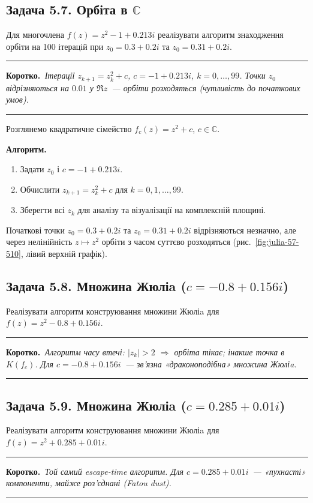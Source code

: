 \documentclass[12pt,a4paper]{article}
\newenvironment{korotko}
  {\par\medskip\noindent\begingroup\color{accent!75!black}\rule{\linewidth}{0.4pt}\par
   \noindent\textbf{Коротко.}\itshape\,}
  {\par\noindent\rule{\linewidth}{0.4pt}\endgroup\medskip}
\begin{document}
\subsection{Задача 5.7. Орбіта в $\mathbb{C}$}
Для многочлена $f(z)=z^2-1+0.213i$ реалізувати алгоритм знаходження орбіти
на 100 ітерацій при $z_0=0.3+0.2i$ та $z_0=0.31+0.2i$.

\begin{korotko}
Ітерації $z_{k+1}=z_k^2+c$, $c=-1+0.213i$, $k=0,\ldots,99$. Точки $z_0$ відрізняються
на $0.01$ у $\Re z$~--- орбіти розходяться (чутливість до початкових умов).
\end{korotko}

Розглянемо квадратичне сімейство $f_c(z)=z^2+c$, $c\in\mathbb{C}$.

\textbf{Алгоритм.}
\begin{enumerate}[leftmargin=1.6em,itemsep=0.25em]
  \item Задати $z_0$ і $c=-1+0.213i$.
  \item Обчислити $z_{k+1}=z_k^2+c$ для $k=0,1,\ldots,99$.
  \item Зберегти всі $z_k$ для аналізу та візуалізації на комплексній площині.
\end{enumerate}

Початкові точки $z_0=0.3+0.2i$ та $z_0=0.31+0.2i$ відрізняються незначно,
але через нелінійність $z\mapsto z^2$ орбіти з часом суттєво розходяться
(рис.~\ref{fig:julia-57-510}, лівий верхній графік).

\subsection{Задача 5.8. Множина Жюліa ($c=-0.8+0.156i$)}
Реалізувати алгоритм конструювання множини Жюліa для
$f(z)=z^2-0.8+0.156i$.

\begin{korotko}
Алгоритм часу втечі: $|z_k|>2$ $\Rightarrow$ орбіта тікає; інакше точка в
$K(f_c)$. Для $c=-0.8+0.156i$~--- зв'язна «драконоподібна» множина Жюліa.
\end{korotko}

\subsection{Задача 5.9. Множина Жюліa ($c=0.285+0.01i$)}
Реалізувати алгоритм конструювання множини Жюліa для
$f(z)=z^2+0.285+0.01i$.

\begin{korotko}
Той самий escape-time алгоритм. Для $c=0.285+0.01i$~--- «пухнасті» компоненти,
майже роз'єднані (Fatou dust).
\end{korotko}
\end{document}
